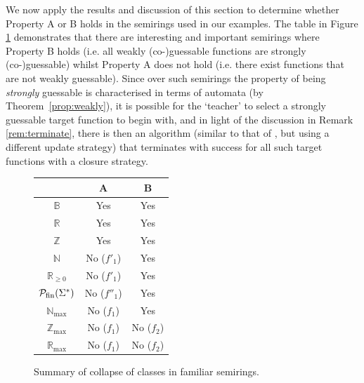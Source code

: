 \documentclass{lmcs}
\numberwithin{theorem}{section}
\begin{document}
We now apply the results and discussion of this section to determine whether Property A or B holds in the semirings used in our examples. The table in Figure \ref{fig:table} demonstrates that there are interesting and important semirings where Property B holds (i.e. all weakly (co-)guessable functions are strongly (co-)guessable) whilst Property A does not hold (i.e. there exist functions that are not weakly guessable). Since over such semirings the property of being \emph{strongly} guessable is  characterised in terms of automata (by Theorem~\ref{prop:weakly}), it is possible for the `teacher' to select a strongly guessable target function to begin with, and in light of the discussion in Remark \ref{rem:terminate}, there is then an algorithm (similar to that of \cite{HKRS20}, but using a different update strategy) that terminates with success for all such target functions with a closure strategy.

\begin{figure}[ht]
	\begin{minipage}{6.5cm}
		\begin{tabular}{c|cc}
			\multicolumn{1}{c}{} & A & B  \\ \toprule
			$\mathbb{B}$ & Yes&  Yes \\ %
			$\mathbb{R}$ & Yes &  Yes  \\ %
			$\mathbb{Z}$ & Yes&  Yes \\ %
			$\mathbb{N}$ & No ($f'_1$) &  Yes   \\ %
			$\mathbb{R}_{\geq 0}$ & No ($f'_1$) &  Yes  \\ %
			$\mathcal{P}_{\rm fin}(\Sigma^*)$ & No ($f''_1$) &  Yes   \\ %
			$\mathbb{N}_{\max}$ & No ($f_1$) & Yes   \\ %
			$\mathbb{Z}_{\max}$ & No ($f_1$) &  No ($f_2$)   \\ %
			$\mathbb{R}_{\max}$ & No ($f_1$)  &  No ($f_2$)  \\
			
		\end{tabular}
	\end{minipage}
	\caption{Summary of collapse of classes in familiar semirings.}
	\label{fig:table}
\end{figure}
\end{document}
